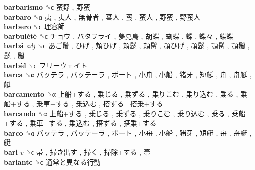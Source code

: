 \textbf{barbarismo} ␝ϲ   蛮野 ,  野蛮   \\
\textbf{barbaro} ␝α   夷 ,  夷人 ,  無骨者 ,  蕃人 ,  蛮 ,  蛮人 ,  野蛮 ,  野蛮人   \\
\textbf{barbero} ␝ϲ   理容師   \\
\textbf{barbulètè} ␝ϲ   チョウ ,  バタフライ ,  夢見鳥 ,  胡蝶 ,  蝴蝶 ,  蝶 ,  蝶々 ,  蝶蝶   \\
\textbf{barbá} \emph{adj}  ␝ϲ   あご鬚 ,  ひげ ,  頬ひげ ,  頬髭 ,  頬髯 ,  顎ひげ ,  顎髭 ,  顎髯 ,  顎鬚 ,  髭 ,  鬚   \\
\textbf{barbèl} ␝ϲ   フリーウェイト   \\
\textbf{barca} ␝α   バッテラ ,  バッテーラ ,  ボート ,  小舟 ,  小船 ,  猪牙 ,  短艇 ,  舟 ,  舟艇 ,  艇   \\
\textbf{barcamento} ␝α   上船+する ,  乗じる ,  乗ずる ,  乗りこむ ,  乗り込む ,  乗る ,  乗船+する ,  乗車+する ,  乗込む ,  搭ずる ,  搭乗+する   \\
\textbf{barcando} ␝α   上船+する ,  乗じる ,  乗ずる ,  乗りこむ ,  乗り込む ,  乗る ,  乗船+する ,  乗車+する ,  乗込む ,  搭ずる ,  搭乗+する   \\
\textbf{barco} ␝α   バッテラ ,  バッテーラ ,  ボート ,  小舟 ,  小船 ,  猪牙 ,  短艇 ,  舟 ,  舟艇 ,  艇   \\
\textbf{bari} \emph{v}  ␝ϲ   帚 ,  掃き出す ,  掃く ,  掃除+する ,  箒   \\
\textbf{bariante} ␝ϲ   通常と異なる行動   \\
